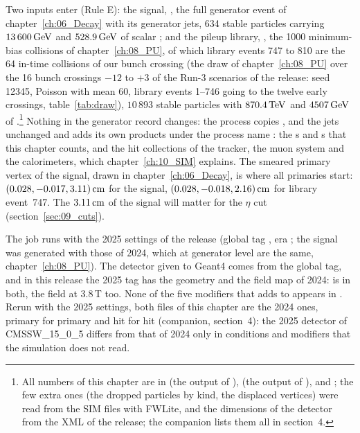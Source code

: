 Two inputs enter (Rule E): the signal, , the full
generator event of chapter~\ref{ch:06_Decay} with its generator jets, 634 stable particles carrying
$13\,600\,\mathrm{GeV}$ and $528.9\,\mathrm{GeV}$ of scalar \pt{}; and the pileup library,
, the 1000 minimum-bias collisions of chapter~\ref{ch:08_PU},
of which library events 747 to 810 are the 64 in-time collisions of our bunch crossing (the draw of
chapter~\ref{ch:08_PU} over the 16 bunch crossings $-12$ to $+3$ of the Run-3 scenarios of the release: seed 12345,
Poisson with mean 60, library events 1--746 going to the twelve early crossings, table~\ref{tab:draw}),
$10\,893$ stable particles with $870.4\,\mathrm{TeV}$ and $4507\,\mathrm{GeV}$ of \pt{}.\footnote{All numbers of this chapter are in
 (the output of ),
 (the output of ), 
and ; the few extra ones (the dropped particles by kind, the displaced vertices)
were read from the SIM files with FWLite, and the dimensions of the detector from the XML of the release; the
companion lists them all in section~4.} Nothing in the generator record changes: the  process copies
,  and the jets unchanged and adds its own products under the
process name : the s and s that this chapter counts, and the hit
collections of the tracker, the muon system and the calorimeters, which chapter~\ref{ch:10_SIM} explains. The smeared primary vertex of the signal, drawn in chapter~\ref{ch:06_Decay}, is where all
primaries start: $(0.028, -0.017, 3.11)\,\mathrm{cm}$ for the signal, $(0.028, -0.018, 2.16)\,\mathrm{cm}$ for library event~747. The
$3.11\,\mathrm{cm}$ of the signal will matter for the $\eta$ cut (section~\ref{sec:09_cuts}).

The  job runs with the 2025 settings of the release (global tag ,
era ; the signal was generated with those of 2024, which at generator level are the same,
chapter~\ref{ch:08_PU}). The detector given to Geant4 comes from the global tag, and in this release the 2025 tag
has the geometry and the field map of 2024:   is
 in both, the field  at 3.8\,T too. None of the five
modifiers that  adds to  appears in . Rerun with the
2025 settings, both files of this chapter are the 2024 ones, primary for primary and hit for hit (companion,
section~4): the 2025 detector of CMSSW\_15\_0\_5 differs from that of 2024 only in conditions and modifiers
that the simulation does not read.

